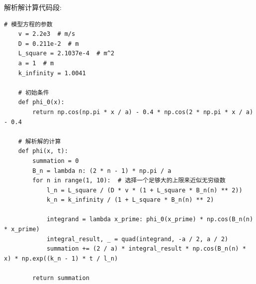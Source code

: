 \documentclass{Sichuan Normal University}
\begin{document}
\noindent 解析解计算代码段:
\begin{lstlisting}[style=python,basicstyle=\footnotesize\fontspec{Courier New},]  
    # 模型方程的参数
    v = 2.2e3  # m/s
    D = 0.211e-2  # m
    L_square = 2.1037e-4  # m^2
    a = 1  # m
    k_infinity = 1.0041

    # 初始条件
    def phi_0(x):
        return np.cos(np.pi * x / a) - 0.4 * np.cos(2 * np.pi * x / a) - 0.4
    
    # 解析解的计算
    def phi(x, t):
        summation = 0
        B_n = lambda n: (2 * n - 1) * np.pi / a
        for n in range(1, 10):  # 选择一个足够大的上限来近似无穷级数
            l_n = L_square / (D * v * (1 + L_square * B_n(n) ** 2))
            k_n = k_infinity / (1 + L_square * B_n(n) ** 2)
    
            integrand = lambda x_prime: phi_0(x_prime) * np.cos(B_n(n) * x_prime)
            integral_result, _ = quad(integrand, -a / 2, a / 2)
            summation += (2 / a) * integral_result * np.cos(B_n(n) * x) * np.exp((k_n - 1) * t / l_n)
    
        return summation
\end{lstlisting}
\end{document}
